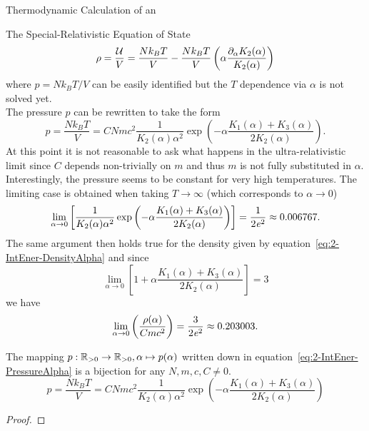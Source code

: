 \begin{section}{Thermodynamic Calculation of an \texorpdfstring{}{EoS}}
\begin{subsection}{The Special-Relativistic Equation of State}
\begin{equation}
	\rho = \frac{\mathcal{U}}{V} = \frac{Nk_B T}{V} - \frac{Nk_B T}{V}\left(\alpha\frac{\partial_\alpha K_2(\alpha)}{K_2(\alpha)}\right)
	\label{eq:2-IntEner-DensityAlpha}
\end{equation}
where $p=Nk_B T/V$ can be easily identified but the $T$ dependence via $\alpha$ is not solved yet.\\
The pressure $p$ can be rewritten to take the form
\begin{equation}
	p = \frac{Nk_B T}{V} = CNmc^2\frac{1}{K_2(\alpha)\alpha^2}\exp\left(-\alpha\frac{K_1(\alpha)+K_3(\alpha)}{2K_2(\alpha)}\right).
	\label{eq:2-IntEner-PressureAlpha}
\end{equation}
At this point it is not reasonable to ask what happens in the ultra-relativistic limit since $C$ depends non-trivially on $m$ and thus $m$ is not fully substituted in $\alpha$.\\
Interestingly, the pressure seems to be constant for very high temperatures.
The limiting case is obtained when taking $T\rightarrow\infty$ (which corresponds to $\alpha\rightarrow0$)
\begin{equation}
	\lim\limits_{\alpha\to0}\left[\frac{1}{K_2(\alpha)\alpha^2}\exp\left(-\alpha\frac{K_1(\alpha)+K_3(\alpha)}{2K_2(\alpha)}\right)\right] = \frac{1}{2\mathit{e}^2} \approx 0.006767.
	\label{eq:2-IntEner-PressureAlpha-Limit}
\end{equation}
The same argument then holds true for the density given by equation~\eqref{eq:2-IntEner-DensityAlpha} and since
\begin{equation}
	\lim\limits_{\alpha\to0}\left[1+\alpha\frac{K_1(\alpha)+K_3(\alpha)}{2K_2(\alpha)}\right] = 3
	\label{eq:2-IntEner-Limit-Alpha}
\end{equation}
we have
\begin{equation}
	\lim\limits_{\alpha\to0}\left(\frac{\rho(\alpha)}{Cmc^2}\right) = \frac{3}{2\mathit{e}^2} \approx 0.203003.
	\label{eq:2-IntEner-Limit-Alpha-2}
\end{equation}
%
%
\begin{theorem}
	The mapping $p:\mathbb{R}_{>0}\rightarrow \mathbb{R}_{>0},\alpha\mapsto p(\alpha)$ written down in equation~\eqref{eq:2-IntEner-PressureAlpha} is a bijection for any $N,m,c,C\neq0$.
	\begin{equation}
		p = \frac{Nk_B T}{V} = CNmc^2\frac{1}{K_2(\alpha)\alpha^2}\exp\left(-\alpha\frac{K_1(\alpha)+K_3(\alpha)}{2K_2(\alpha)}\right)
		\label{eq:2-IntEner-Pressure-Alpha-Dependence}
	\end{equation}
\end{theorem}
\begin{proof}

\end{proof}
\end{subsection}
\end{section}
